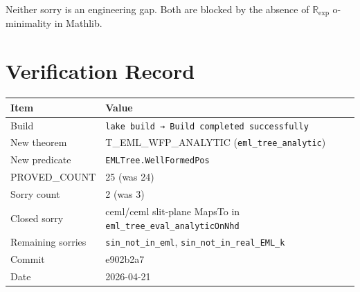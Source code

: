 \documentclass[12pt]{article}
\begin{document}
Neither sorry is an engineering gap. Both are blocked by the absence of
$\mathbb{R}_{\exp}$ o-minimality in Mathlib.

\section{Verification Record}

\begin{center}
\begin{tabular}{ll}
\toprule
Item & Value \\
\midrule
Build & \textcolor{proved}{\texttt{lake build → Build completed successfully}} \\
New theorem & T\_EML\_WFP\_ANALYTIC (\texttt{eml\_tree\_analytic}) \\
New predicate & \texttt{EMLTree.WellFormedPos} \\
PROVED\_COUNT & 25 (was 24) \\
Sorry count & 2 (was 3) \\
Closed sorry & ceml/ceml slit-plane MapsTo in \texttt{eml\_tree\_eval\_analyticOnNhd} \\
Remaining sorries & \texttt{sin\_not\_in\_eml}, \texttt{sin\_not\_in\_real\_EML\_k} \\
Commit & e902b2a7 \\
Date & 2026-04-21 \\
\bottomrule
\end{tabular}
\end{center}
\end{document}
